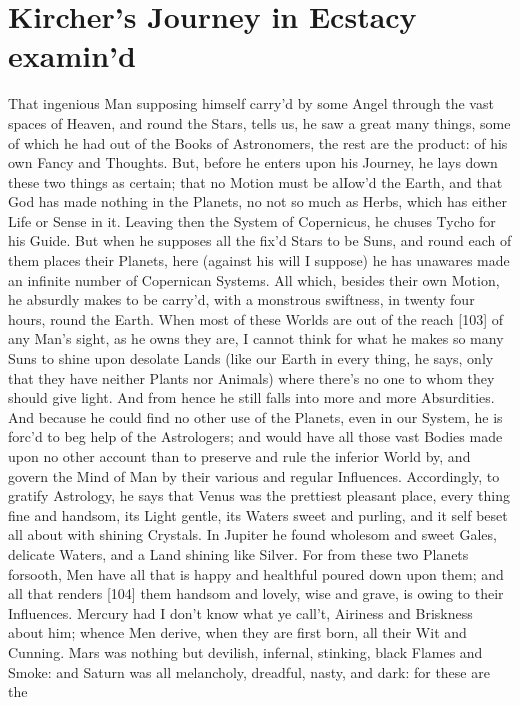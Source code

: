 \documentclass[letterpaper]{book}
\begin{document}
\section{Kircher's Journey in Ecstacy examin'd}

That ingenious Man supposing himself carry'd by some Angel through the vast
spaces of Heaven, and round the Stars, tells us, he saw a great many things,
some of which he had out of the Books of Astronomers, the rest are the
product: of his own Fancy and Thoughts. But, before he enters upon his
Journey, he lays down these two things as certain; that no Motion must be
alIow'd the Earth, and that God has made nothing in the Planets, no not so
much as Herbs, which has either Life or Sense in it. Leaving then the System
of Copernicus, he chuses Tycho for his Guide. But when he supposes all the
fix'd Stars to be Suns, and round each of them places their Planets, here
(against his will I suppose) he has unawares made an infinite number of
Copernican Systems. All which, besides their own Motion, he absurdly makes
to be carry'd, with a monstrous swiftness, in twenty four hours, round the
Earth. When most of these Worlds are out of the reach [103] of any Man's
sight, as he owns they are, I cannot think for what he makes so many Suns to
shine upon desolate Lands (like our Earth in every thing, he says, only that
they have neither Plants nor Animals) where there's no one to whom they
should give light. And from hence he still falls into more and more
Absurdities. And because he could find no other use of the Planets, even in
our System, he is forc'd to beg help of the Astrologers; and would have all
those vast Bodies made upon no other account than to preserve and rule the
inferior World by, and govern the Mind of Man by their various and regular
Influences. Accordingly, to gratify Astrology, he says that Venus was the
prettiest pleasant place, every thing fine and handsom, its Light gentle,
its Waters sweet and purling, and it self beset all about with shining
Crystals. In Jupiter he found wholesom and sweet Gales, delicate Waters, and a
Land shining like Silver. For from these two Planets forsooth, Men have all
that is happy and healthful poured down upon them; and all that renders
[104] them handsom and lovely, wise and grave, is owing to their Influences.
Mercury had I don't know what ye call't, Airiness and Briskness about him;
whence Men derive, when they are first born, all their Wit and Cunning. Mars
was nothing but devilish, infernal, stinking, black Flames and Smoke: and
Saturn was all melancholy, dreadful, nasty, and dark: for these are the
\end{document}
